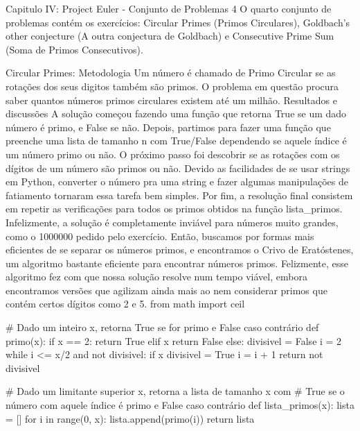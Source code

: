 Capitulo IV: Project Euler - Conjunto de Problemas 4
    O quarto conjunto de problemas contém os exercícios: Circular Primes (Primos Circulares), Goldbach's other conjecture (A outra conjectura de Goldbach) e Consecutive Prime Sum (Soma de Primos Consecutivos).

    Circular Primes:
        Metodologia
            Um número é chamado de Primo Circular se as rotações dos seus digitos também são primos. O problema em questão procura saber quantos números primos circulares existem até um milhão.
        Resultados e discussões
            A solução começou fazendo uma função que retorna True se um dado número é primo, e False se não. Depois, partimos para fazer uma função que preenche uma lista de tamanho n com True/False dependendo se aquele índice é um número primo ou não.
            O próximo passo foi descobrir se as rotações com os dígitos de um número são primos ou não. Devido as facilidades de se usar strings em Python, converter o número pra uma string e fazer algumas manipulações de fatiamento tornaram essa tarefa bem simples.
            Por fim, a resolução final consistem em repetir as verificações para todos os primos obtidos na função lista_primos. Infelizmente, a solução é completamente inviável para números muito grandes, como o 1000000 pedido pelo exercício. Então, buscamos por formas mais eficientes de se separar os números primos, e encontramos o Crivo de Eratóstenes, um algoritmo bastante eficiente para encontrar números primos. Felizmente, esse algoritmo fez com que nossa solução resolve num tempo viável, embora encontramos versões que agilizam ainda mais ao nem considerar primos que contém certos dígitos como 2 e 5.
            from math import ceil

            # Dado um inteiro x, retorna True se for primo e False caso contrário
            def primo(x):
                if x == 2:
                    return True
                elif x %
                    return False
                else:
                    divisivel = False
                    i = 2
                    while i <= x/2 and not divisivel:
                        if x %
                            divisivel = True
                        i = i + 1
                return not divisivel

            # Dado um limitante superior x, retorna a lista de tamanho x com
            # True se o número com aquele índice é primo e False caso contrário
            def lista_primos(x):
                lista = []
                for i in range(0, x):
                    lista.append(primo(i))
                return lista

